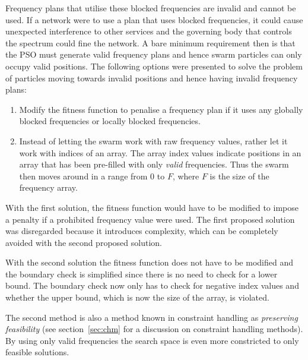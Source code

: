 Frequency plans that utilise these blocked frequencies are invalid and cannot be used. If a network were to use a plan that uses blocked frequencies, it could cause unexpected interference to other services and the governing body that controls the spectrum could fine the network. A bare minimum requirement then is that the \gls{PSO} must generate valid frequency plans and hence swarm particles can only occupy valid positions. The following options were presented to solve the problem of particles moving towards invalid positions and hence having invalid frequency plans:
\begin{enumerate}
\item Modify the fitness function to penalise a frequency plan if it uses any globally blocked frequencies or locally blocked frequencies.
\item Instead of letting the swarm work with raw frequency values, rather let it work with indices of an array. The array index values indicate positions in an array that has been pre-filled with only \emph{valid} frequencies. Thus the swarm then moves around in a range from 0 to $F$, where $F$ is the size of the frequency array.
\end{enumerate}

With the first solution, the fitness function would have to be modified to impose a penalty if a prohibited frequency value were used. The first proposed solution was disregarded because it introduces complexity, which can be completely avoided with the second proposed solution.

With the second solution the fitness function does not have to be modified and the boundary check is simplified since there is no need to check for a lower bound. The boundary check now only has to check for negative index values and whether the upper bound, which is now the size of the array, is violated. 

The second method is also a method known in constraint handling as \emph{preserving feasibility} (see section~\ref{sec:chm} for a discussion on constraint handling methods). By using only valid frequencies the search space is even more constricted to only feasible solutions.


